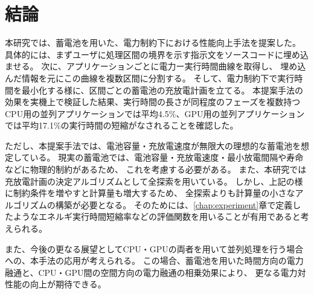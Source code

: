 \chapter{結論}
\label{chap:conclusion}


本研究では、蓄電池を用いた、電力制約下における性能向上手法を提案した。
具体的には、まずユーザに処理区間の境界を示す指示文をソースコードに埋め込ませる。
次に、アプリケーションごとに電力ー実行時間曲線を取得し、
埋め込んだ情報を元にこの曲線を複数区間に分割する。
そして、電力制約下で実行時間を最小化する様に、区間ごとの蓄電池の充放電計画を立てる。
本提案手法の効果を実機上で検証した結果、実行時間の長さが同程度のフェーズを複数持つCPU用の並列アプリケーションでは平均4.5\%、GPU用の並列アプリケーションでは平均17.1\%の実行時間の短縮がなされることを確認した。


ただし、本提案手法では、電池容量・充放電速度が無限大の理想的な蓄電池を想定している。
現実の蓄電池では、電池容量・充放電速度・最小放電間隔や寿命などに物理的制約があるため、
これを考慮する必要がある。
また、本研究では充放電計画の決定アルゴリズムとして全探索を用いている。
しかし、上記の様に制約条件を増やすと計算量も増大するため、
全探索よりも計算量の小さなアルゴリズムの構築が必要となる。
そのためには、\ref{chap:experiment}章で定義したようなエネルギ実行時間短縮率などの評価関数を用いることが有用であると考えられる。


また、今後の更なる展望としてCPU・GPUの両者を用いて並列処理を行う場合への、本手法の応用が考えられる。
この場合、蓄電池を用いた時間方向の電力融通と、CPU・GPU間の空間方向の電力融通の相乗効果により、
更なる電力対性能の向上が期待できる。

